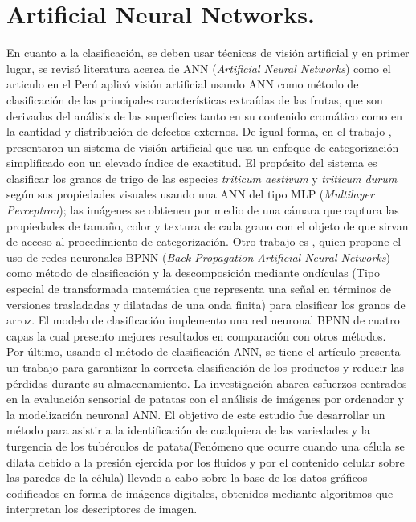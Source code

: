 \section{Artificial Neural Networks.}
	En cuanto a la clasificación, se deben usar técnicas de visión artificial y en primer lugar, se revisó literatura  acerca de ANN (\textit{Artificial Neural Networks}) como el articulo \cite{article2} en el Perú  aplicó visión artificial usando ANN como método de clasificación de las principales características extraídas de las frutas, que son derivadas del análisis de las superficies tanto en su contenido cromático como en la cantidad y distribución de defectos externos. De igual forma, en el trabajo \cite{Shrivastava2017}, presentaron un sistema de visión artificial que usa un enfoque de categorización simplificado con un elevado índice de exactitud. El propósito del sistema es clasificar los granos de trigo de las especies \textit{triticum aestivum} y \textit{triticum durum} según sus propiedades visuales usando una ANN del tipo MLP (\textit{Multilayer Perceptron}); las imágenes se obtienen por medio de una cámara que captura las propiedades de tamaño, color y textura de cada grano con el objeto de que sirvan de acceso al procedimiento de categorización. Otro trabajo es \cite{Singh2016}, quien propone el uso de redes neuronales BPNN (\textit{Back Propagation Artificial Neural Networks}) como método de clasificación y la descomposición mediante ondículas (Tipo especial de transformada matemática que representa una señal en términos de versiones trasladadas y dilatadas de una onda finita) para clasificar los granos de arroz. El modelo de clasificación implemento una red neuronal BPNN de cuatro capas la cual presento mejores resultados en comparación con otros métodos.\\
	
	Por último, usando el método de clasificación ANN, se tiene el artículo \cite{Przybyl2019} presenta un trabajo para garantizar la correcta clasificación de los productos y reducir las pérdidas durante su almacenamiento. La investigación abarca esfuerzos centrados en la evaluación sensorial de patatas con el análisis de imágenes por ordenador y la modelización neuronal ANN. El objetivo de este estudio fue desarrollar un método para asistir a la identificación de cualquiera de las variedades y la turgencia de los tubérculos de patata(Fenómeno que ocurre cuando una célula se dilata debido a la presión ejercida por los fluidos y por el contenido celular sobre las paredes de la célula) llevado a cabo sobre la base de los datos gráficos codificados en forma de imágenes digitales, obtenidos mediante algoritmos que interpretan los descriptores de imagen.\\

